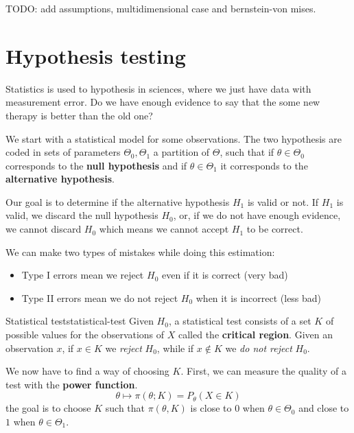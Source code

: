 \documentclass[12pt]{extarticle}
\begin{document}
TODO: add assumptions, multidimensional case and bernstein-von mises.

\section{Hypothesis testing}

Statistics is used to  hypothesis in sciences, where we just have data with measurement error.
Do we have enough evidence to say that the some new therapy is better than the old one?

We start with a statistical model for some observations.
The two hypothesis are coded in sets of parameters $\Theta_0, \Theta_1$ a partition of $\Theta$, such that if $\theta \in \Theta_0$ corresponds to the \textbf{null hypothesis} and if $\theta \in \Theta_1$ it corresponds to the \textbf{alternative hypothesis}.

Our goal is to determine if the alternative hypothesis $H_1$ is valid or not.
If $H_1$ is valid, we discard the null hypothesis $H_0$, or, if we do not have enough evidence, we cannot discard $H_0$ which means we cannot accept $H_1$ to be correct.

We can make two types of mistakes while doing this estimation:
\begin{itemize}
    \item Type I errors mean we reject $H_0$ even if it is correct (very bad)
    \item Type II errors mean we do not reject $H_0$ when it is incorrect (less bad)
\end{itemize}

\begin{definition}{Statistical test}{statistical-test}
    Given $H_0$, a statistical test consists of a set $K$ of possible values for the observations of $X$ called the \textbf{critical region}.
    Given an observation $x$, if $x \in K$ we \emph{reject} $H_0$, while if $x \notin K$ we \emph{do not reject} $H_0$.
\end{definition}

We now have to find a way of choosing $K$.
First, we can measure the quality of a test with the \textbf{power function}.
\begin{equation}
    \theta \mapsto \pi(\theta; K) = P_\theta(X \in K)
\end{equation}
the goal is to choose $K$ such that $\pi(\theta, K)$ is close to $0$ when $\theta \in \Theta_0$ and close to $1$ when $\theta \in \Theta_1$.
\end{document}
